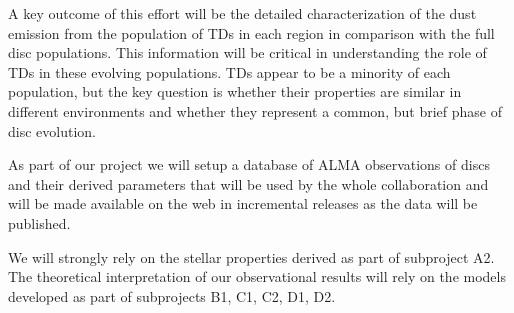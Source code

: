 A key outcome of this effort will be the detailed characterization of the dust emission from the population of TDs in each region in comparison with the full disc populations. This information will be critical in understanding the role of TDs in these evolving populations. TDs appear to be a minority of each population, but the key question is whether their properties are similar in different environments and whether they represent a common, but brief phase of disc evolution.


As part of our project we will setup a database of ALMA observations of discs and their derived parameters that will be used by the whole collaboration and will be made available on the web in incremental releases as the data will be published.

\vspace{0.5em}

We will strongly rely on the stellar properties derived as part of subproject A2. The theoretical interpretation of our observational results will rely on the models developed as part of subprojects B1, C1, C2, D1, D2.



